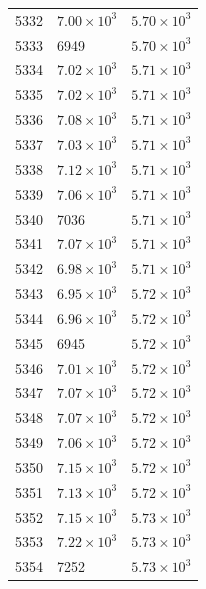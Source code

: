 \begin{table}[H]
\begin{tabular}{lll}
5332 & $\displaystyle 7.00 \times 10^{3}$ & $\displaystyle 5.70 \times 10^{3}$ \\
5333 & 6949 & $\displaystyle 5.70 \times 10^{3}$ \\
5334 & $\displaystyle 7.02 \times 10^{3}$ & $\displaystyle 5.71 \times 10^{3}$ \\
5335 & $\displaystyle 7.02 \times 10^{3}$ & $\displaystyle 5.71 \times 10^{3}$ \\
5336 & $\displaystyle 7.08 \times 10^{3}$ & $\displaystyle 5.71 \times 10^{3}$ \\
5337 & $\displaystyle 7.03 \times 10^{3}$ & $\displaystyle 5.71 \times 10^{3}$ \\
5338 & $\displaystyle 7.12 \times 10^{3}$ & $\displaystyle 5.71 \times 10^{3}$ \\
5339 & $\displaystyle 7.06 \times 10^{3}$ & $\displaystyle 5.71 \times 10^{3}$ \\
5340 & 7036 & $\displaystyle 5.71 \times 10^{3}$ \\
5341 & $\displaystyle 7.07 \times 10^{3}$ & $\displaystyle 5.71 \times 10^{3}$ \\
5342 & $\displaystyle 6.98 \times 10^{3}$ & $\displaystyle 5.71 \times 10^{3}$ \\
5343 & $\displaystyle 6.95 \times 10^{3}$ & $\displaystyle 5.72 \times 10^{3}$ \\
5344 & $\displaystyle 6.96 \times 10^{3}$ & $\displaystyle 5.72 \times 10^{3}$ \\
5345 & 6945 & $\displaystyle 5.72 \times 10^{3}$ \\
5346 & $\displaystyle 7.01 \times 10^{3}$ & $\displaystyle 5.72 \times 10^{3}$ \\
5347 & $\displaystyle 7.07 \times 10^{3}$ & $\displaystyle 5.72 \times 10^{3}$ \\
5348 & $\displaystyle 7.07 \times 10^{3}$ & $\displaystyle 5.72 \times 10^{3}$ \\
5349 & $\displaystyle 7.06 \times 10^{3}$ & $\displaystyle 5.72 \times 10^{3}$ \\
5350 & $\displaystyle 7.15 \times 10^{3}$ & $\displaystyle 5.72 \times 10^{3}$ \\
5351 & $\displaystyle 7.13 \times 10^{3}$ & $\displaystyle 5.72 \times 10^{3}$ \\
5352 & $\displaystyle 7.15 \times 10^{3}$ & $\displaystyle 5.73 \times 10^{3}$ \\
5353 & $\displaystyle 7.22 \times 10^{3}$ & $\displaystyle 5.73 \times 10^{3}$ \\
5354 & 7252 & $\displaystyle 5.73 \times 10^{3}$ \\

\end{tabular}
\end{table}
